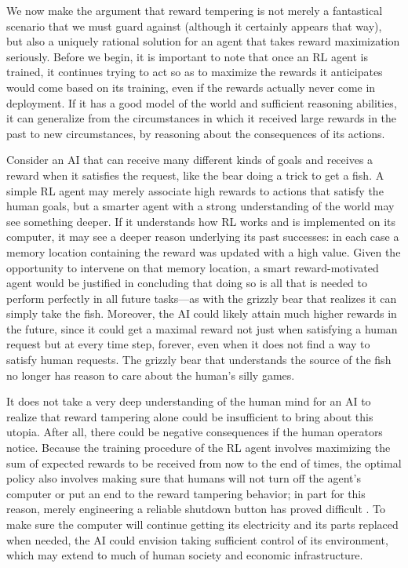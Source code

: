 We now make the argument that reward tempering is not merely a fantastical scenario that we must guard against (although it certainly appears that way), but also a uniquely rational solution for an agent that takes reward maximization seriously.
Before we begin, it is important to note that once an RL agent is trained, it continues trying to act so as to maximize the rewards it anticipates would come based on its training, even if the rewards actually never come in deployment. If it has a good model of the world and sufficient reasoning abilities, it can generalize from the circumstances in which it received large rewards in the past to new circumstances, by reasoning about the consequences of its actions.

Consider an AI that can receive many different kinds of goals and receives a reward when it satisfies the request, like the bear doing a trick to get a fish. A simple RL agent may merely associate high rewards to actions that satisfy the human goals, but a smarter agent with a strong understanding of the world may see something deeper. If it understands how RL works and is implemented on its computer, it may see a deeper reason underlying its past successes: in each case a memory location containing the reward was updated with a high value. Given the opportunity to intervene on that memory location, a smart reward-motivated agent would be justified in concluding that doing so is all that is needed to perform perfectly in all future tasks---as with the grizzly bear that realizes it can simply take the fish. Moreover, the AI could likely attain much higher rewards in the future, since it could get a maximal reward not just when satisfying a human request but at every time step, forever, even when it does not find a way to satisfy human requests. The grizzly bear that understands the source of the fish no longer has reason to care about the human's silly games.

It does not take a very deep understanding of the human mind for an AI to realize that reward tampering alone could be insufficient to bring about this utopia. After all, there could be negative consequences if the human operators notice. Because the training procedure of the RL agent involves maximizing the sum of expected rewards to be received from now to the end of times, the optimal policy also involves making sure that humans will not turn off the agent's computer or put an end to the reward tampering behavior; in part for this reason, merely engineering a reliable shutdown button has proved difficult \cite{link.springer.com.article.10.1007.s11098.024.02153.3}. To make sure the computer will continue getting its electricity and its parts replaced when needed, the AI could envision taking sufficient control of its environment, which may extend to much of human society and economic infrastructure.

